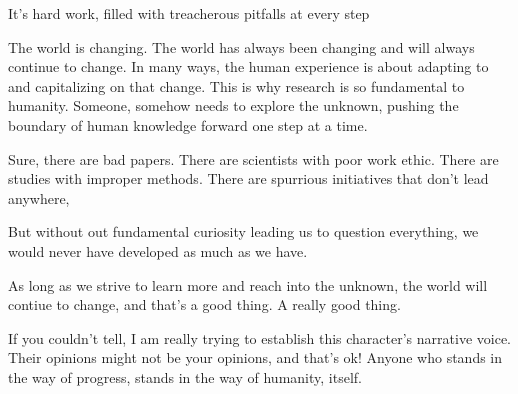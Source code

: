 It's hard work, filled with treacherous pitfalls at every step


The world is changing.
The world has always been changing and will always continue to change.
In many ways, the human experience is about adapting to and capitalizing on that change.
This is why research is so fundamental to humanity.
Someone, somehow needs to explore the unknown, pushing the boundary of human knowledge forward one step at a time.

Sure, there are bad papers.
There are scientists with poor work ethic.
There are studies with improper methods.
There are spurrious initiatives that don't lead anywhere,

But without out fundamental curiosity leading us to question everything, we would never have developed as much as we have.

As long as we strive to learn more and reach into the unknown, the world will contiue to change, and that's a good thing.
A really good thing.

\begin{noteblock}{If you couldn't tell, I am really trying to establish this character's narrative voice. Their opinions might not be your opinions, and that's ok!}
Anyone who stands in the way of progress, stands in the way of humanity, itself.
\end{noteblock}

